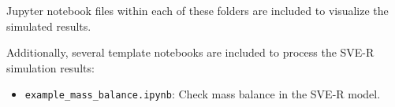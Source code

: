 \documentclass{article}
\newcommand{\code}[1]{\texttt{#1}}
\begin{document}
Jupyter notebook files within each of these folders are included to visualize the simulated results.

Additionally, several template notebooks are included to process the SVE-R simulation results:

\begin{itemize}
	\item \code{example\_mass\_balance.ipynb}: Check mass balance in the SVE-R model. 
\end{itemize}



%
%
% 

\end{document}
